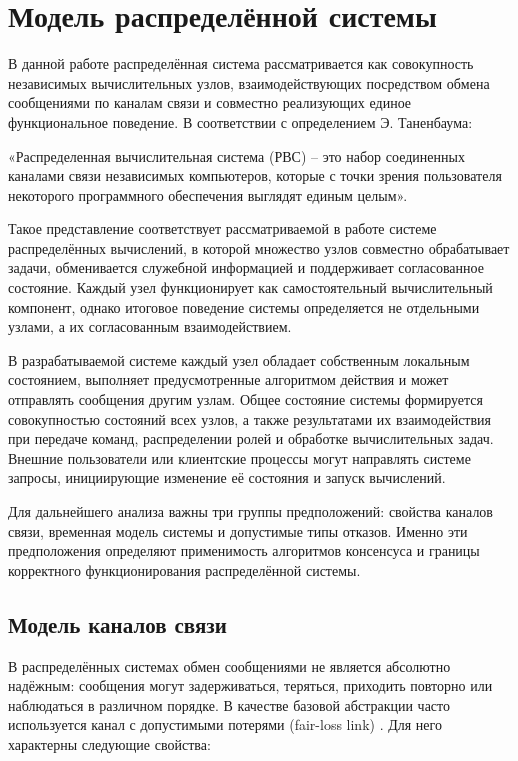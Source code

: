 \section{Модель распределённой системы}

В данной работе распределённая система рассматривается как совокупность
независимых вычислительных узлов, взаимодействующих посредством обмена
сообщениями по каналам связи и совместно реализующих единое функциональное
поведение. В соответствии с определением Э.
Таненбаума\cite{tanenbaum_distributed_systems}:

«Распределенная вычислительная система (РВС) – это набор соединенных каналами
связи независимых компьютеров, которые с точки зрения пользователя некоторого
программного обеспечения выглядят единым целым».

Такое представление соответствует рассматриваемой в работе системе
распределённых вычислений, в которой множество узлов совместно обрабатывает
задачи, обменивается служебной информацией и поддерживает согласованное
состояние. Каждый узел функционирует как самостоятельный вычислительный
компонент, однако итоговое поведение системы определяется не отдельными узлами,
а их согласованным взаимодействием.

В разрабатываемой системе каждый узел обладает собственным локальным
состоянием, выполняет предусмотренные алгоритмом действия и может отправлять
сообщения другим узлам. Общее состояние системы формируется совокупностью
состояний всех узлов, а также результатами их взаимодействия при передаче
команд, распределении ролей и обработке вычислительных задач. Внешние
пользователи или клиентские процессы могут направлять системе запросы,
инициирующие изменение её состояния и запуск вычислений.

Для дальнейшего анализа важны три группы предположений: свойства каналов связи,
временная модель системы и допустимые типы отказов. Именно эти предположения
определяют применимость алгоритмов консенсуса и границы корректного
функционирования распределённой системы.

\subsection{Модель каналов связи}

В распределённых системах обмен сообщениями не является абсолютно надёжным:
сообщения могут задерживаться, теряться, приходить повторно или наблюдаться в
различном порядке. В качестве базовой абстракции часто используется канал с
допустимыми потерями (fair-loss link) \cite{cachin11}. Для него характерны
следующие свойства:

